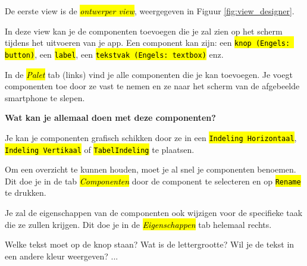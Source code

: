 De eerste view is de \hl{\emph{ontwerper view}}, weergegeven in Figuur \ref{fig:view_designer}.


In deze view kan je de componenten toevoegen die je zal zien op het scherm tijdens het uitvoeren van je app.
Een component kan zijn: een \hl{\texttt{knop (Engels: button)}}, een \hl{\texttt{label}}, een \hl{\texttt{tekstvak (Engels: textbox)}} enz.

\begin{minipage}{.3\linewidth}
\end{minipage}
\hspace{2cm}
\begin{minipage}{.5\linewidth}
	In de \hl{\emph{Palet}} tab (links) vind je alle componenten die je kan toevoegen. Je voegt componenten toe door ze vast te nemen en ze naar het scherm van de afgebeelde smartphone te slepen. 
\end{minipage}


\textbf{Wat kan je allemaal doen met deze componenten? }

\begin{minipage}{.3\linewidth}
\end{minipage}
\hspace{2cm}
\begin{minipage}{.5\linewidth}
	Je kan je componenten grafisch schikken door ze in een \hl{\texttt{Indeling Horizontaal}}, \hl{\texttt{Indeling Vertikaal}} of \hl{\texttt{TabelIndeling}} te plaatsen.
\end{minipage}

\begin{minipage}{.5\linewidth}
	Om een overzicht te kunnen houden, moet je al snel je componenten benoemen. Dit doe je in de tab \hl{\emph{Componenten}}
	door de component te selecteren en op \hl{\texttt{Rename}} te drukken.
\end{minipage}
\hspace{2cm}
\begin{minipage}{.3\linewidth}
\end{minipage}

\begin{minipage}{.5\linewidth}
	Je zal de eigenschappen van de componenten ook wijzigen voor de specifieke taak die ze zullen krijgen. Dit doe je in de \hl{\emph{Eigenschappen}} tab helemaal rechts.
	
	Welke tekst moet op de knop staan? Wat is de lettergrootte? Wil je de tekst in een andere kleur weergeven? ... 
\end{minipage}
\hspace{2cm}
\begin{minipage}{.3\linewidth}
\end{minipage}

